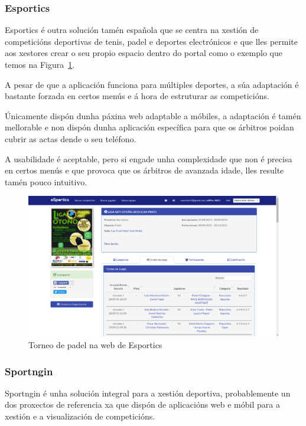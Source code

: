     \subsubsection{Esportics}

    Esportics é outra solución tamén española que se centra na xestión de 
competicións deportivas de tenis, padel e deportes electrónicos e que lles 
permite aos xestores crear o seu propio espacio dentro do portal como o exemplo 
que temos na Figura~\ref{fig:img:esportics}.

A pesar de que a aplicación funciona para múltiples deportes, a súa adaptación 
é bastante forzada en certos menús e á hora de estruturar as competicións.

    Únicamente dispón dunha páxina web adaptable a móbiles, a adaptación é 
tamén mellorable e non dispón dunha aplicación específica para 
que os árbitros poidan cubrir as actas dende o seu teléfono.

    A usabilidade é aceptable, pero si engade unha complexidade 
que non é precisa en certos menús e que provoca que os árbitros de avanzada 
idade, lles resulte tamén pouco intuitivo.

    \begin{figure}[h!]
      \begin{center}
	\includegraphics[width=\textwidth]{./img/esportics-app.png}
	\caption{Torneo de padel na web de Esportics}
	\label{fig:img:esportics}
      \end{center}
    \end{figure}

    \subsubsection{Sportngin}

    Sportngin é unha solución integral para a xestión deportiva, probablemente 
un dos proxectos de referencia xa que dispón de aplicacións web e móbil para a 
xestión e a visualización de competicións.

